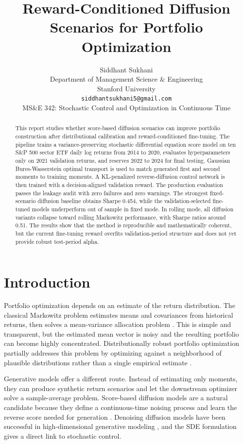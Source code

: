 \documentclass{article}
\title{Reward-Conditioned Diffusion Scenarios for Portfolio Optimization}
\author{%
  Siddhant Sukhani \\
  Department of Management Science \& Engineering \\
  Stanford University \\
  \texttt{siddhantsukhani5@gmail.com} \\
  MS\&E 342: Stochastic Control and Optimization in Continuous Time
}
\begin{document}
\maketitle

\begin{abstract}
This report studies whether score-based diffusion scenarios can improve portfolio
construction after distributional calibration and reward-conditioned
fine-tuning. The pipeline trains a variance-preserving stochastic differential
equation score model on ten S\&P 500 sector ETF daily log returns from 2014 to
2020, evaluates hyperparameters only on 2021 validation returns, and reserves
2022 to 2024 for final testing. Gaussian Bures-Wasserstein optimal transport is
used to match generated first and second moments to training moments. A
KL-penalized reverse-diffusion control network is then trained with a
decision-aligned validation reward. The production evaluation passes the
leakage audit with zero failures and zero warnings. The strongest
fixed-scenario diffusion baseline obtains Sharpe 0.454,
while the validation-selected fine-tuned models underperform out of sample in
fixed mode. In rolling mode, all diffusion variants collapse toward rolling
Markowitz performance, with Sharpe ratios around 0.51. The results show that the
method is reproducible and mathematically coherent, but the current
fine-tuning reward overfits validation-period structure and does not yet provide
robust test-period alpha.
\end{abstract}

\section{Introduction}

Portfolio optimization depends on an estimate of the return distribution. The
classical Markowitz problem estimates means and covariances from historical
returns, then solves a mean-variance allocation problem \citep{markowitz1952}.
This is simple and transparent, but the estimated mean vector is noisy and the
resulting portfolio can become highly concentrated. Distributionally robust
portfolio optimization partially addresses this problem by optimizing against a
neighborhood of plausible distributions rather than a single empirical estimate
\citep{blanchet2022}.

Generative models offer a different route. Instead of estimating only moments,
they can produce synthetic return scenarios and let the downstream optimizer
solve a sample-average problem. Score-based diffusion models are a natural
candidate because they define a continuous-time noising process and learn the
reverse score needed for generation \citep{song2021}. Denoising diffusion models
have been successful in high-dimensional generative modeling \citep{ho2020}, and
the SDE formulation gives a direct link to stochastic control.
\end{document}
